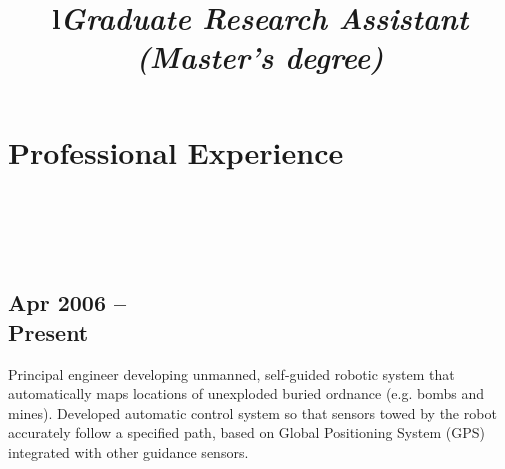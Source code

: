 \begin{resume}



\vspace{-0.4cm}

\section{\sc Professional Experience}

\begin{format}
\title{l}\\
\\
\body\\
\end{format}


\title{\em Graduate Research Assistant (Master's degree)}
\dates{ }
\section{ } %

\begin{position}
\vspace{-0.9cm}

\section{\sc \small \hspace{8mm}Apr 2006 --\\\hspace{8mm}Present}
Principal engineer developing unmanned, self-guided robotic system that automatically maps locations of unexploded buried ordnance (e.g. bombs and mines). Developed automatic control system so that sensors towed by the robot accurately follow a specified path, based on Global Positioning System (GPS) integrated with other guidance sensors.


\end{position}
\end{resume}
